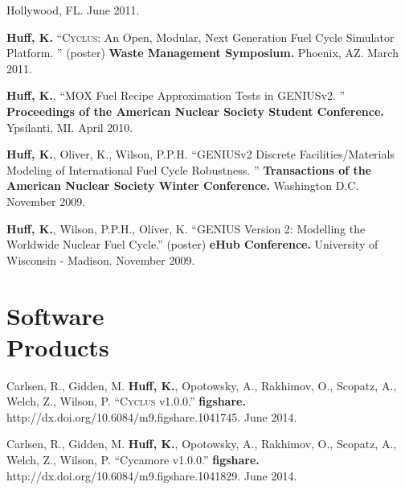 \documentclass[margin,line]{resume}
\newcommand{\Cyclus}{\textsc{Cyclus}\xspace}%
\begin{document}
\begin{resume}
\begin{bibenum}
        Hollywood, FL. June 2011.
      \item \textbf{Huff, K.} ``\Cyclus: An Open, Modular, Next Generation Fuel Cycle Simulator Platform. ''
        (poster)  \textbf{Waste Management Symposium.} Phoenix, AZ. March
        2011.
      \item \textbf{Huff, K.}, ``MOX Fuel Recipe Approximation Tests in GENIUSv2. ''
         \textbf{Proceedings of the American Nuclear Society Student Conference.}
        Ypsilanti, MI. April 2010.
      \item \textbf{Huff, K.}, Oliver, K., Wilson, P.P.H. ``GENIUSv2 Discrete Facilities/Materials Modeling of International
        Fuel Cycle Robustness. ''
         \textbf{Transactions of the American Nuclear Society Winter Conference.}
        Washington D.C. November 2009.
      \item \textbf{Huff, K.}, Wilson, P.P.H., Oliver, K. ``GENIUS Version 2: Modelling the Worldwide Nuclear Fuel Cycle.''
        (poster)  \textbf{eHub Conference.} University of Wisconsin -
        Madison. November 2009.
    \end{bibenum}

    \section{\mysidestyle Software\\Products}
    \begin{bibenum}
      \item Carlsen, R., Gidden, M. \textbf{Huff, K.}, Opotowsky, A., Rakhimov, O., Scopatz, A., Welch, Z., Wilson, P. ``\Cyclus v1.0.0.'' \textbf{figshare.}
http://dx.doi.org/10.6084/m9.figshare.1041745. June 2014.
      \item Carlsen, R., Gidden, M. \textbf{Huff, K.}, Opotowsky, A., Rakhimov, O., Scopatz, A., Welch, Z., Wilson, P. ``Cycamore v1.0.0.'' \textbf{figshare.}
http://dx.doi.org/10.6084/m9.figshare.1041829. June 2014.
    \end{bibenum}

\end{resume}
\end{document}
